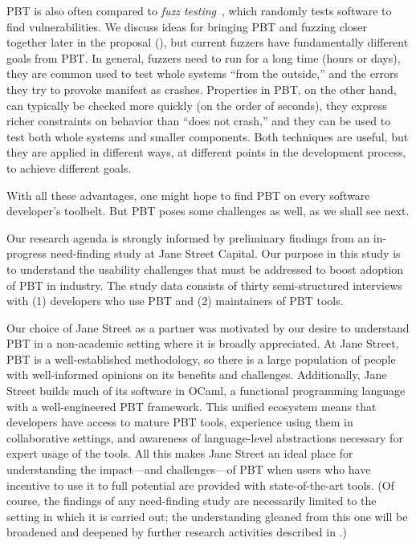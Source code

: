 PBT is also often compared to {\em fuzz testing}~\cite{afl-readme},
which randomly tests software to find
vulnerabilities. We discuss ideas for bringing PBT and
fuzzing closer together later in the proposal
(), but current fuzzers have fundamentally
different goals from PBT.  In general, fuzzers need to run for a long time (hours or
days), they are common used to test whole systems ``from the
outside,'' and the errors they try to provoke manifest as
crashes. Properties in PBT, on the other hand, can typically be
checked more quickly (on the order of seconds), they express richer
constraints on behavior than ``does not crash,'' and they can be used
to test both whole systems and smaller components.  Both techniques are useful, but
they are applied in different ways, at different points in the
development process, to achieve different goals.

With all these advantages, one might hope to find PBT on every
software developer's toolbelt.  But PBT poses some challenges as well,
as we shall see next.

%
Our research agenda is strongly informed by preliminary findings from
an in-progress need-finding study at Jane Street Capital.  Our purpose
in this
study is to understand the usability challenges that must be addressed
to boost adoption of PBT in
industry. The study data consists of thirty semi-structured interviews
with (1) developers who use PBT and (2) maintainers of PBT tools.

Our choice of Jane Street as a partner was motivated by our desire to
understand PBT in a non-academic setting where it is broadly appreciated.
At Jane Street, PBT is a
well-established methodology, so there is a large
population of people with well-informed opinions on its benefits and
challenges. Additionally, Jane Street builds much of its
software in OCaml, a functional programming language with
a well-engineered PBT framework.
%
This unified
ecosystem means that developers have access to mature PBT tools,
experience using them in collaborative settings,
and awareness of language-level abstractions necessary
for expert usage of the tools.
%
All this makes Jane Street an ideal place for understanding the
impact---and challenges---of PBT when users who have incentive to use
it to full potential are provided with state-of-the-art tools.
%
(Of course, the findings of any need-finding study are necessarily
limited to the setting in which it is carried out; the understanding
gleaned from this one will be broadened and deepened by further
research activities described in .)

